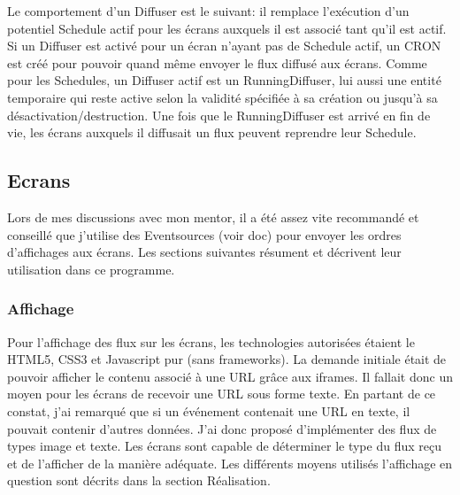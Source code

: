 \documentclass[french]{article}
\begin{document}
Le comportement d'un Diffuser est le suivant: il remplace l'exécution d'un potentiel Schedule actif pour les écrans auxquels il est associé tant qu'il est actif. Si un Diffuser est activé pour un écran n'ayant pas de Schedule actif, un CRON est créé pour pouvoir quand même envoyer le flux diffusé aux écrans. \newline
Comme pour les Schedules, un Diffuser actif est un RunningDiffuser, lui aussi une entité temporaire qui reste active selon la validité spécifiée à sa création ou jusqu'à sa désactivation/destruction. Une fois que le RunningDiffuser est arrivé en fin de vie, les écrans auxquels il diffusait un flux peuvent reprendre leur Schedule. 

\newpage
\subsection{Ecrans}

Lors de mes discussions avec mon mentor, il a été assez vite recommandé et conseillé que j'utilise des Eventsources (voir doc) pour envoyer les ordres d'affichages aux écrans. Les sections suivantes résument et décrivent leur utilisation dans ce programme.

\subsubsection{Affichage}
Pour l'affichage des flux sur les écrans, les technologies autorisées étaient le HTML5, CSS3 et Javascript pur (sans frameworks). La demande initiale était de pouvoir afficher le contenu associé à une URL grâce aux iframes. Il fallait donc un moyen pour les écrans de recevoir une URL sous forme texte. En partant de ce constat, j'ai remarqué que si un événement contenait une URL en texte, il pouvait contenir d'autres données. J'ai donc proposé d'implémenter des flux de types image et texte. \newline
Les écrans sont capable de déterminer le type du flux reçu et de l'afficher de la manière adéquate. Les différents moyens utilisés l'affichage en question sont décrits dans la section Réalisation.
\end{document}
